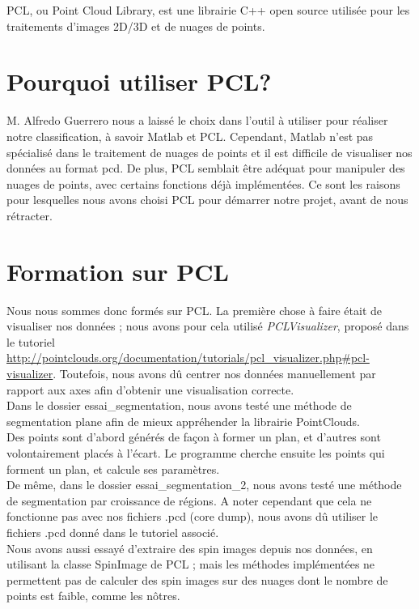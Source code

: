 PCL, ou Point Cloud Library, est une librairie C++ open source utilisée pour les traitements d'images 2D/3D et de nuages de points.\\

\section{Pourquoi utiliser PCL?}

M. Alfredo Guerrero nous a laissé le choix dans l'outil à utiliser pour réaliser notre classification, à savoir Matlab et PCL. Cependant, Matlab n'est pas spécialisé dans le traitement de nuages de points et il est difficile de visualiser nos données au format pcd. De plus, PCL semblait être adéquat pour manipuler des nuages de points, avec certains fonctions déjà implémentées. Ce sont les raisons pour lesquelles nous avons choisi PCL pour démarrer notre projet, avant de nous rétracter.\\

\section{Formation sur PCL}

	Nous nous sommes donc formés sur PCL. La première chose à faire était de visualiser nos données ; nous avons pour cela utilisé \emph{PCLVisualizer}, proposé dans le tutoriel \url{http://pointclouds.org/documentation/tutorials/pcl_visualizer.php#pcl-visualizer}. Toutefois, nous avons dû centrer nos données manuellement par rapport aux axes afin d'obtenir une visualisation correcte.\\

	Dans le dossier essai\_segmentation, nous avons testé une méthode de segmentation plane afin de mieux appréhender la librairie PointClouds.\\
	Des points sont d'abord générés de façon à former un plan, et d'autres sont volontairement placés à l'écart. Le programme cherche ensuite les points qui forment un plan, et calcule ses paramètres.\\

	De même, dans le dossier essai\_segmentation\_2, nous avons testé une méthode de segmentation par croissance de régions. A noter cependant que cela ne fonctionne pas avec nos fichiers .pcd (core dump), nous avons dû utiliser le fichiers .pcd donné dans le tutoriel associé.\\

	Nous avons aussi essayé d'extraire des spin images depuis nos données, en utilisant la classe SpinImage de PCL ; mais les méthodes implémentées ne permettent pas de calculer des spin images sur des nuages dont le nombre de points est faible, comme les nôtres.\\

